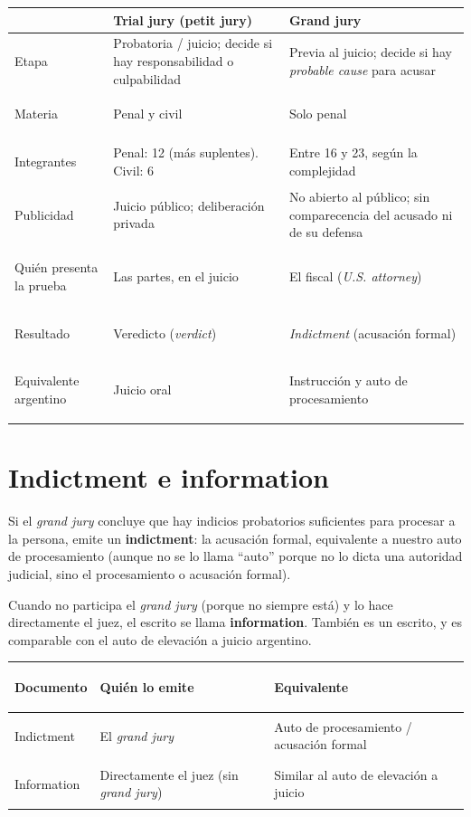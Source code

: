 \documentclass[12pt,oneside]{book}
\begin{document}
\begin{table}[H]
\centering
\small
\renewcommand{\arraystretch}{1.25}
\begin{tabularx}{\textwidth}{@{}>{\bfseries\raggedright\arraybackslash}p{}YY@{}}
\toprule
 & \textbf{Trial jury (petit jury)} & \textbf{Grand jury} \\
\midrule
Etapa & Probatoria / juicio; decide si hay responsabilidad o culpabilidad & Previa al juicio; decide si hay \textit{probable cause} para acusar \\
Materia & Penal y civil & Solo penal \\
Integrantes & Penal: 12 (más suplentes). Civil: 6 & Entre 16 y 23, según la complejidad \\
Publicidad & Juicio público; deliberación privada & No abierto al público; sin comparecencia del acusado ni de su defensa \\
Quién presenta la prueba & Las partes, en el juicio & El fiscal (\textit{U.S. attorney}) \\
Resultado & Veredicto (\textit{verdict}) & \textit{Indictment} (acusación formal) \\
Equivalente argentino & Juicio oral & Instrucción y auto de procesamiento \\
\bottomrule
\end{tabularx}
\end{table}

\section{Indictment e information}

Si el \textit{grand jury} concluye que hay indicios probatorios suficientes para procesar a la persona, emite un \textbf{indictment}: la acusación formal, equivalente a nuestro auto de procesamiento (aunque no se lo llama ``auto'' porque no lo dicta una autoridad judicial, sino el procesamiento o acusación formal).

Cuando no participa el \textit{grand jury} (porque no siempre está) y lo hace directamente el juez, el escrito se llama \textbf{information}. También es un escrito, y es comparable con el auto de elevación a juicio argentino.

\begin{table}[H]
\centering
\small
\renewcommand{\arraystretch}{1.25}
\begin{tabularx}{\textwidth}{@{}>{\bfseries\raggedright\arraybackslash}p{}YY@{}}
\toprule
Documento & Quién lo emite & Equivalente \\
\midrule
Indictment & El \textit{grand jury} & Auto de procesamiento / acusación formal \\
Information & Directamente el juez (sin \textit{grand jury}) & Similar al auto de elevación a juicio \\
\bottomrule
\end{tabularx}
\end{table}
\end{document}

